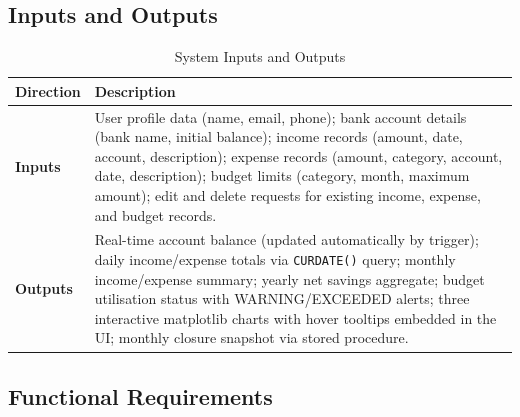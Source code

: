 \documentclass[12pt, a4paper]{article}
\begin{document}
\subsection{Inputs and Outputs}

\begin{table}[H]
\centering
\caption{System Inputs and Outputs}
\begin{tabularx}{\textwidth}{>{\bfseries}lX}
\toprule
\textbf{Direction} & \textbf{Description} \\
\midrule
\textbf{Inputs}
& User profile data (name, email, phone); bank account details (bank name,
  initial balance); income records (amount, date, account, description);
  expense records (amount, category, account, date, description); budget
  limits (category, month, maximum amount); edit and delete requests for
  existing income, expense, and budget records. \\
\addlinespace
\textbf{Outputs}
& Real-time account balance (updated automatically by trigger);
  daily income/expense totals via \texttt{CURDATE()} query;
  monthly income/expense summary; yearly net savings aggregate;
  budget utilisation status with WARNING/EXCEEDED alerts;
  three interactive matplotlib charts with hover tooltips embedded in the UI;
  monthly closure snapshot via stored procedure. \\
\bottomrule
\end{tabularx}
\end{table}

\subsection{Functional Requirements}
\end{document}
